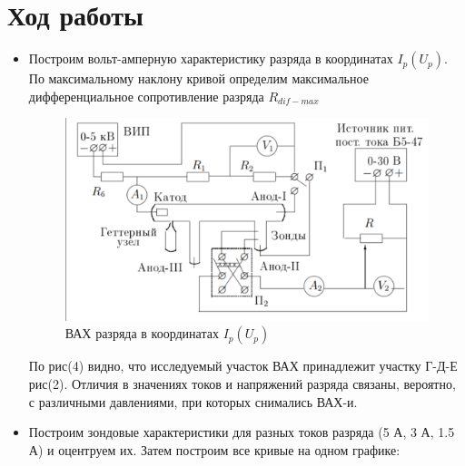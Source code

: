 \documentclass[a4paper,12pt]{article}
\begin{document}
    \section*{Ход работы}
        \begin{itemize}
            \item 
            Построим вольт-амперную характеристику разряда в координатах $I_p(U_p)$. По максимальному наклону кривой определим максимальное дифференциальное сопротивление разряда $R_{dif-max}$
            \begin{figure}[!h]
                \begin{center}
                    \includegraphics[width = 1\textwidth]{Снимок экрана 2024-12-14 021850.png}
                \end{center}
                \caption{ВАХ разряда в координатах $I_p(U_p)$}
            \end{figure}
            По рис(4) видно, что исследуемый участок ВАХ принадлежит участку Г-Д-Е рис(2). Отличия в значениях токов и напряжений разряда связаны, вероятно, с различными давлениями, при которых снимались ВАХ-и.

            \item 
            Построим зондовые характеристики для разных токов разряда (5 А, 3 А, 1.5 А) и оцентруем их. 
            Затем построим все кривые на одном графике:
            

\end{itemize}
\end{document}
